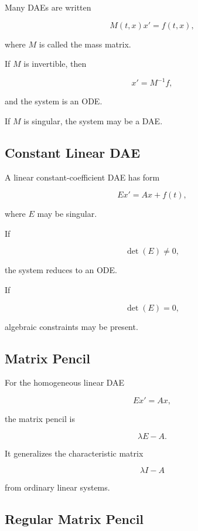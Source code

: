 Many DAEs are written

\[
\boxed{
M(t,x)x'
=
f(t,x),
}
\]

where \(M\) is called the mass matrix.

If \(M\) is invertible, then

\[
\boxed{
x'
=
M^{-1}f,
}
\]

and the system is an ODE.

If \(M\) is singular, the system may be a DAE.

\subsection{Constant Linear DAE}
\label{subsec:constant-linear-dae}

A linear constant-coefficient DAE has form

\[
\boxed{
E x'
=
A x
+
f(t),
}
\]

where \(E\) may be singular.

If

\[
\det(E)\neq0,
\]

the system reduces to an ODE.

If

\[
\det(E)=0,
\]

algebraic constraints may be present.

\subsection{Matrix Pencil}
\label{subsec:dae-matrix-pencil}

For the homogeneous linear DAE

\[
E x'=Ax,
\]

the matrix pencil is

\[
\boxed{
\lambda E-A.
}
\]

It generalizes the characteristic matrix

\[
\lambda I-A
\]

from ordinary linear systems.

\subsection{Regular Matrix Pencil}
\label{subsec:regular-matrix-pencil}

